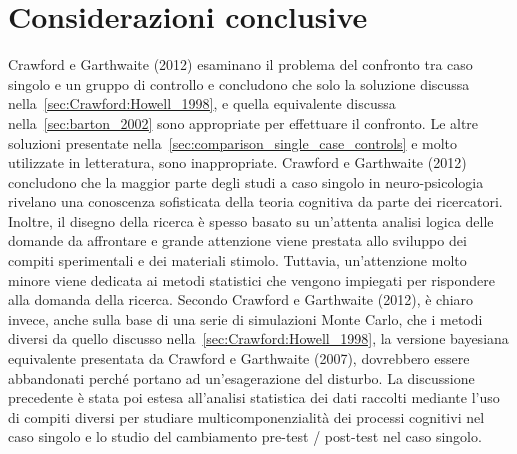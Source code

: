 \section*{Considerazioni conclusive}

Crawford e Garthwaite (2012) esaminano il problema del confronto tra caso singolo e un gruppo di controllo e concludono che solo la soluzione discussa nella~\ref{sec:Crawford:Howell_1998}, e quella equivalente discussa nella~\ref{sec:barton_2002} sono appropriate per effettuare il confronto.
Le altre soluzioni presentate nella~\ref{sec:comparison_single_case_controls} e molto utilizzate in letteratura, sono inappropriate.
Crawford e Garthwaite (2012) concludono che la maggior parte degli studi a caso singolo in neuro-psicologia rivelano una conoscenza sofisticata della teoria cognitiva da parte dei ricercatori. 
Inoltre, il disegno della ricerca è spesso basato su un'attenta analisi logica delle domande da affrontare e grande attenzione viene prestata allo sviluppo dei compiti sperimentali e dei materiali stimolo. 
Tuttavia, un'attenzione molto minore viene dedicata ai metodi statistici che vengono impiegati per rispondere alla domanda della ricerca. 
Secondo Crawford e Garthwaite (2012), è chiaro invece, anche sulla base di una serie di simulazioni Monte Carlo, che i metodi diversi da quello discusso nella~\ref{sec:Crawford:Howell_1998}, la versione bayesiana equivalente presentata da Crawford e Garthwaite (2007), dovrebbero essere abbandonati perché portano ad un'esagerazione del disturbo.
La discussione precedente è stata poi estesa all'analisi statistica dei dati raccolti mediante l'uso di compiti diversi per studiare multicomponenzialità dei processi cognitivi nel caso singolo e lo studio del cambiamento pre-test / post-test nel caso singolo. 






